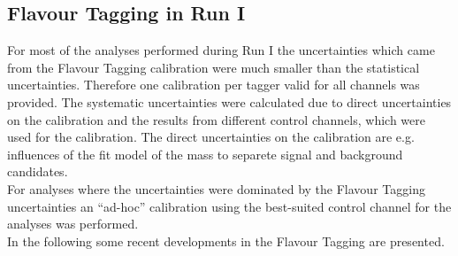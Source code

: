 \documentclass{PoS}
\begin{document}
\subsection{Flavour Tagging in Run I}\label{sec:4}

For most of the analyses performed during Run I the uncertainties which came from the Flavour Tagging calibration were much smaller than the statistical uncertainties. Therefore one calibration per tagger valid for all channels was provided. The systematic uncertainties were calculated due to direct uncertainties on the calibration and the results from different control channels, which were used for the calibration. The direct uncertainties on the calibration are e.g. influences of the fit model of the mass to separete signal and background candidates.\\
For analyses where the uncertainties were dominated by the Flavour Tagging uncertainties an \enquote{ad-hoc} calibration using the best-suited control channel for the analyses was performed. \\
In the following some recent developments in the Flavour Tagging are presented.



%
\end{document}
